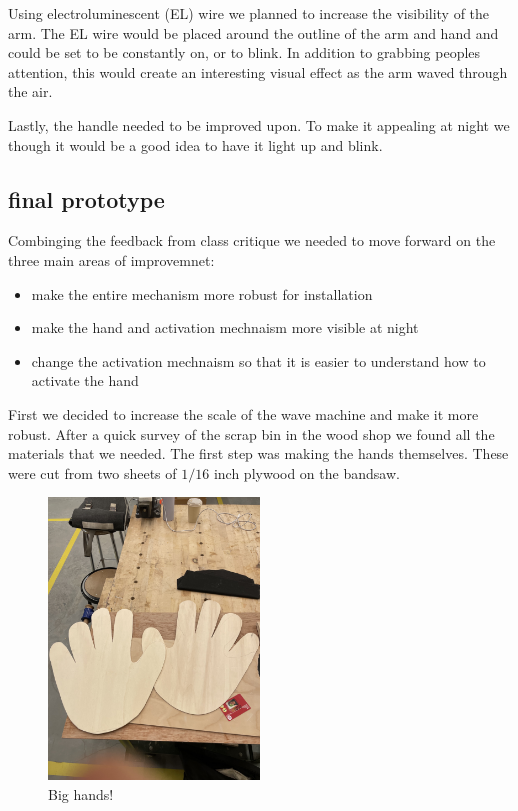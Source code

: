 \documentclass[11pt]{report}
\begin{document}
Using electroluminescent (EL) wire we planned to increase the visibility of the arm. The EL wire would be placed around the outline of the arm and hand and could be set to be constantly on, or to blink. In addition to grabbing peoples attention, this would create an interesting visual effect as the arm waved through the air.

Lastly, the handle needed to be improved upon. To make it appealing at night we though it would be a good idea to have it light up and blink.

\clearpage
\subsection*{final prototype}

Combinging the feedback from class critique we needed to move forward on the three main areas of improvemnet:
\begin{itemize}
\item
  make the entire mechanism more robust for installation
\item
  make the hand and activation mechnaism more visible at night
\item
  change the activation mechnaism so that it is easier to understand how to activate the hand
\end{itemize}

First we decided to increase the scale of the wave machine and make it more robust. After a quick survey of the scrap bin in the wood shop we found all the materials that we needed. The first step was making the hands themselves. These were cut from two sheets of $1/16$ inch plywood on the bandsaw. 

\begin{figure}[ht!]
\centering
\includegraphics[width=0.5\textwidth, angle=270]{"images/III/plainhands.jpg"}
\caption{Big hands!}
\end{figure}
\end{document}
